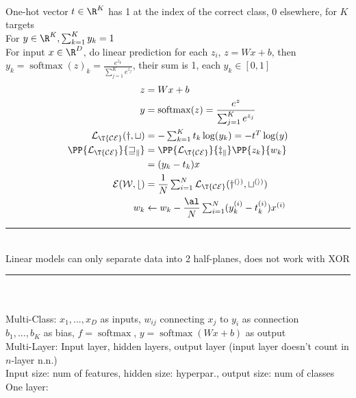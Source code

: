 \documentclass[10pt]{CheatSheet/hw}
\begin{document}
\np 
\begin{multicols*}{5}
\\
One-hot vector $t\in\R^K$ has 1 at the index of the correct class, 0 elsewhere, for $K$ targets\\
For $y\in\R^K, \sum_{k=1}^K y_k=1$\\
For input $x\in\R^D$, do linear prediction for each $z_i$, $z=Wx+b$, then $y_k=\operatorname{softmax}(z)_k=\frac{e^{z_k}}{\sum_{j=1}^K e^{z_j}}$, their sum is 1, each $y_k\in[0,1]$
\begin{align*}
    z&= Wx+b\\
    y&=\operatorname{softmax}(z)=\frac{e^z}{\textstyle\sum_{j=1}^K e^{z_j}}\\
    \cal{L}_{\T{CE}}(y,t)&=-\textstyle\sum_{k=1}^K t_k\log(y_k)=-t^T\log(y)\\
    \PP{\cal{L}_{\T{CE}}}{w_k}&=\PP{\cal{L}_{\T{CE}}}{z_k}\PP{z_k}{w_k}\\
    &=(y_k-t_k)x\\
    \cal{E}(W,b)&=\frac1N\textstyle\sum_{i=1}^N\cal{L}_{\T{CE}}(y^{(i)},t^{(i)})\\
    w_k&\gets w_k-\frac{\al}{N}\textstyle\sum_{i=1}^N(y_k^{(i)}-t_k^{(i)})x^{(i)}
\end{align*}
\rule{\linewidth}{0.4pt}\\
Linear models can only separate data into 2 half-planes, does not work with XOR
\rule{\linewidth}{0.4pt}\\
\\
Multi-Class: $x_1,...,x_D$ as inputs, $w_{ij}$ connecting $x_j$ to $y_i$ as connection\\
$b_1,...,b_K$ as bias, $f=\operatorname{softmax}$, $y=\operatorname{softmax}(Wx+b)$ as output\\
Multi-Layer: Input layer, hidden layers, output layer (input layer doesn't count in $n$-layer n.n.)\\
Input size: num of features, hidden size: hyperpar., output size: num of classes\\
One layer:
\vspace{-5pt}
\vspace{-5pt}

\end{multicols*}
\end{document}

